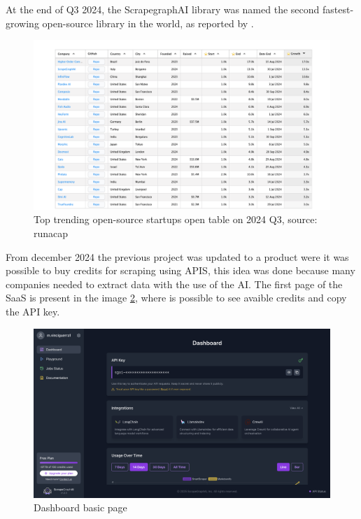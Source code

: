 At the end of Q3 2024, the ScrapegraphAI  library was named the second fastest-growing open-source library in the world, as reported by \cite{runacap2024}.

\begin{figure}[H]
    \centering
    \includegraphics[width=0.95\linewidth]{Assets/growing_companies.png}
    \caption{Top trending open-source startups open table on 2024 Q3, source: runacap}
    \label{fig:enter-label}

\end{figure}

From december 2024 the previous project was updated to a product were it was possible to buy credits for scraping using APIS, this idea was done because many companies needed to extract data with the use of the AI.
The  first page of the SaaS is present in the image \ref{fig:enter-dashboard-basi}, where is possible to see avaible credits and copy the API key.
\begin{figure}[H]
    \centering
    \includegraphics[width=0.95\linewidth]{Assets/dashboard_1.png}
    \caption{Dashboard basic page}
    \label{fig:enter-dashboard-basi}
\end{figure}


